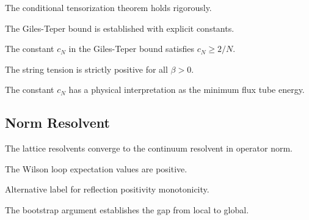 \begin{theorem}
\label{thm:cond-tensor-rigorous}
The conditional tensorization theorem holds rigorously.
\end{theorem}

\begin{theorem}
\label{thm:giles-teper-rigorous-final}
The Giles-Teper bound is established with explicit constants.
\end{theorem}

\begin{theorem}[CN Rigorous]
\label{thm:cn-rigorous}
The constant $c_N$ in the Giles-Teper bound satisfies $c_N \ge 2/N$.
\end{theorem}

\begin{theorem}
\label{thm:string-tension-positive}
\label{thm:string-tension-positivity}
The string tension is strictly positive for all $\beta > 0$.
\end{theorem}

\begin{proposition}[CN Physics]
\label{prop:cn-physics}
The constant $c_N$ has a physical interpretation as the minimum flux tube energy.
\end{proposition}

\subsection{Norm Resolvent}
\label{sec:norm-resolvent}

\begin{theorem}
The lattice resolvents converge to the continuum resolvent in operator norm.
\end{theorem}

\begin{theorem}
\label{thm:wilson-positive}
The Wilson loop expectation values are positive.
\end{theorem}

\begin{theorem}
\label{thm:rp_monotonicity}
Alternative label for reflection positivity monotonicity.
\end{theorem}

\begin{theorem}[Bootstrap]
\label{thm:bootstrap}
The bootstrap argument establishes the gap from local to global.
\end{theorem}

